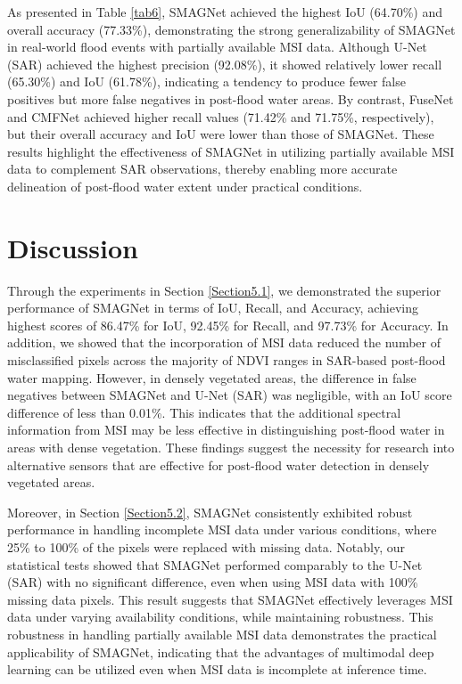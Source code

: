 \documentclass[preprint,12pt,authoryear]{elsarticle}
\begin{document}
As presented in Table \ref{tab6}, SMAGNet achieved the highest IoU (64.70\%) and overall accuracy (77.33\%), demonstrating the strong generalizability of SMAGNet in real-world flood events with partially available MSI data. Although U-Net (SAR) achieved the highest precision (92.08\%), it showed relatively lower recall (65.30\%) and IoU (61.78\%), indicating a tendency to produce fewer false positives but more false negatives in post-flood water areas. By contrast, FuseNet and CMFNet achieved higher recall values (71.42\% and 71.75\%, respectively), but their overall accuracy and IoU were lower than those of SMAGNet. These results highlight the effectiveness of SMAGNet in utilizing partially available MSI data to complement SAR observations, thereby enabling more accurate delineation of post-flood water extent under practical conditions.

\section{Discussion}
\label{Section6}

Through the experiments in Section \ref{Section5.1}, we demonstrated the superior performance of SMAGNet in terms of IoU, Recall, and Accuracy, achieving highest scores of 86.47\% for IoU, 92.45\% for Recall, and 97.73\% for Accuracy. In addition, we showed that the incorporation of MSI data reduced the number of misclassified pixels across the majority of NDVI ranges in SAR-based post-flood water mapping. However, in densely vegetated areas, the difference in false negatives between SMAGNet and U-Net (SAR) was negligible, with an IoU score difference of less than 0.01\%. This indicates that the additional spectral information from MSI may be less effective in distinguishing post-flood water in areas with dense vegetation. These findings suggest the necessity for research into alternative sensors that are effective for post-flood water detection in densely vegetated areas.

Moreover, in Section \ref{Section5.2}, SMAGNet consistently exhibited robust performance in handling incomplete MSI data under various conditions, where 25\% to 100\% of the pixels were replaced with missing data. Notably, our statistical tests showed that SMAGNet performed comparably to the U-Net (SAR) with no significant difference, even when using MSI data with 100\% missing data pixels. This result suggests that SMAGNet effectively leverages MSI data under varying availability conditions, while maintaining robustness. This robustness in handling partially available MSI data demonstrates the practical applicability of SMAGNet, indicating that the advantages of multimodal deep learning can be utilized even when MSI data is incomplete at inference time.
\end{document}
